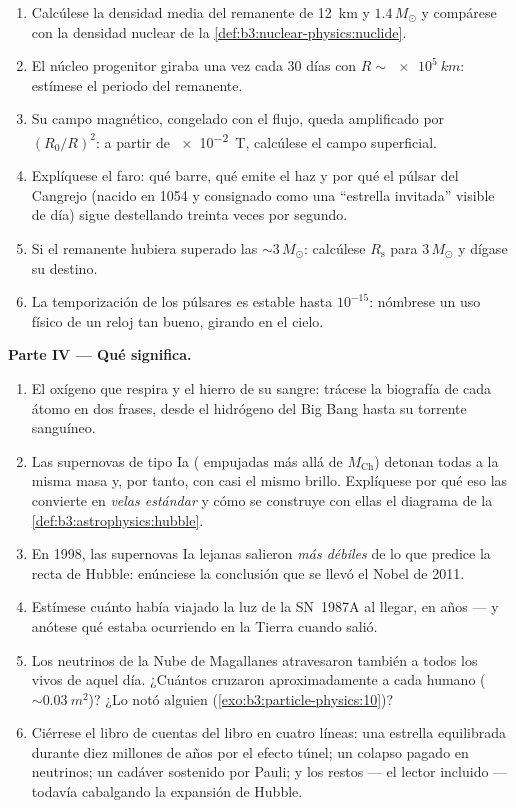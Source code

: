 \begin{problem}
\begin{enumerate}[resume]
  \item Calcúlese la densidad media del remanente de \qty{12}{km} y
        $1.4\,M_\odot$ y compárese con la densidad nuclear de la
        \cref{def:b3:nuclear-physics:nuclide}.
  \item El núcleo progenitor giraba una vez cada 30 días con
        $R \sim \qty{e5}{km}$: estímese el periodo del remanente.
  \item Su campo magnético, congelado con el flujo, queda amplificado por
        $(R_0/R)^2$: a partir de \qty{e-2}{T}, calcúlese el campo
        superficial.
  \item Explíquese el faro: qué barre, qué emite el haz y
        por qué el púlsar del Cangrejo (nacido en 1054 y consignado como una
        ``estrella invitada'' visible de día) sigue destellando treinta veces por segundo.
  \item Si el remanente hubiera superado las ${\sim}3\,M_\odot$: calcúlese
        $R_{\text{s}}$ para $3\,M_\odot$ y dígase su destino.
  \item La temporización de los púlsares es estable hasta $10^{-15}$: nómbrese un uso
        físico de un reloj tan bueno, girando en el cielo.
\end{enumerate}

\medskip\noindent\textbf{Parte IV --- Qué significa.}

\begin{enumerate}[resume]
  \item El oxígeno que respira y el hierro de su sangre:
        trácese la biografía de cada átomo en dos frases, desde el
        hidrógeno del Big Bang hasta su torrente sanguíneo.
  \item Las supernovas de tipo Ia ( empujadas más allá de
        $M_{\text{Ch}}$) detonan todas a la misma masa y, por tanto,
        con casi el mismo brillo. Explíquese por qué eso las convierte en
        \emph{velas estándar} y cómo se construye con ellas
        el diagrama de la \cref{def:b3:astrophysics:hubble}.
  \item En 1998, las supernovas Ia lejanas salieron \emph{más débiles}
        de lo que predice la recta de Hubble: enúnciese la
        conclusión que se llevó el Nobel de 2011.
  \item Estímese cuánto había viajado la luz de la SN~1987A al
        llegar, en años --- y anótese qué estaba ocurriendo en la
        Tierra cuando salió.
  \item Los neutrinos de la Nube de Magallanes atravesaron también a todos
        los vivos de aquel día. ¿Cuántos cruzaron aproximadamente a cada humano
        (${\sim}\qty{0.03}{m^2}$)? ¿Lo notó alguien
        (\cref{exo:b3:particle-physics:10})?
  \item Ciérrese el libro de cuentas del libro en cuatro líneas: una estrella equilibrada
        durante diez millones de años por el efecto túnel; un colapso pagado
        en neutrinos; un cadáver sostenido por Pauli; y los
        restos --- el lector incluido --- todavía cabalgando
        la expansión de Hubble.
\end{enumerate}
\end{problem}

